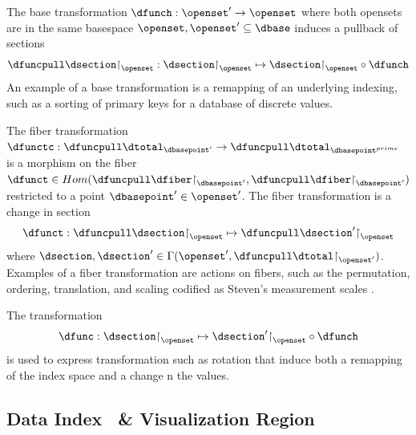\documentclass[10pt,journal,compsoc]{IEEEtran}
\renewcommand{\restriction}{\mathord{\upharpoonright}} %
\theoremstyle{definition}
\theoremstyle{remark}
\begin{document}
The base transformation $\dfunch: \openset^{\prime}\rightarrow \openset$ where both opensets are in the same basespace $\openset, \openset^{\prime} \subseteq \dbase$ induces a pullback of sections 
\begin{equation}
  \dfuncpull \dsection \restriction_{\openset}: \dsection\restriction_{\openset} \mapsto \dsection \restriction_{\openset} \circ \dfunch 
\end{equation}
An example of a base transformation is a remapping of an underlying indexing, such as a sorting of primary keys for a database of discrete values.  

The fiber transformation $\dfunctc: \dfuncpull \dtotal_{\dbasepoint^{\prime}} \rightarrow \dfuncpull \dtotal_{\dbasepoint^{prime}}$ is a morphism on the fiber $\dfunct \in Hom(\dfuncpull\dfiber\restriction_{\dbasepoint^{\prime}},\dfuncpull\dfiber\restriction_{\dbasepoint^{\prime}})$ restricted to a point $\dbasepoint^{\prime} \in \openset^{\prime}$. The fiber transformation is a change in section 
\begin{equation}
  \dfunct: \dfuncpull \dsection \restriction_{\openset} \mapsto \dfuncpull \dsection^{\prime} \restriction_{\openset}
\end{equation}
where $\dsection, \dsection^{\prime} \in \Gamma(\openset^{\prime}, \dfuncpull\dtotal\restriction_{\openset^{\prime}})$. Examples of a fiber transformation are actions on fibers, such as the permutation, ordering, translation, and scaling codified as Steven's measurement scales \cite{stevensTheoryScalesMeasurement1946}. 

The transformation 
\begin{equation}
  \dfunc: \dsection\restriction_{\openset} \mapsto \dsection^{\prime}\restriction_{\openset} \circ \dfunch
\end{equation}
is used to express transformation such as rotation that induce both a remapping of the index space and a change n the values. 

\subsection{ Data Index \dbasec\ \& Visualization Region \gbasec}
\end{document}
